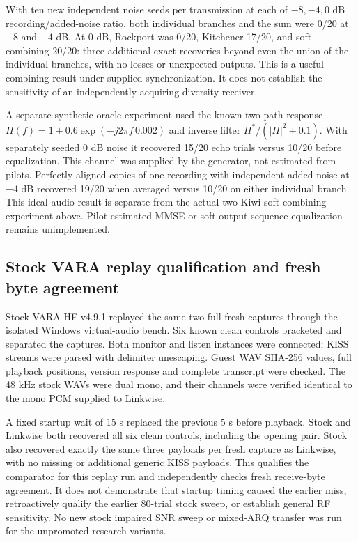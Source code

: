 \documentclass[11pt,a4paper]{article}
\begin{document}
With ten new independent noise seeds per transmission at each of $-8,-4,0$
dB recording/added-noise ratio, both individual branches and the sum were
0/20 at $-8$ and $-4$ dB. At 0 dB, Rockport was 0/20, Kitchener 17/20, and
soft combining 20/20: three additional exact recoveries beyond even the
union of the individual branches, with no losses or unexpected outputs.
This is a useful combining result under supplied synchronization. It does
not establish the sensitivity of an independently acquiring diversity receiver.

A separate synthetic oracle experiment used the known two-path response
$H(f)=1+0.6\exp(-j2\pi f\,0.002)$ and inverse filter
$H^*/(|H|^2+0.1)$. With separately seeded 0 dB noise it recovered 15/20 echo
trials versus 10/20 before equalization. This channel was supplied by the
generator, not estimated from pilots. Perfectly aligned copies of one recording
with independent added noise at $-4$ dB recovered 19/20 when averaged versus
10/20 on either individual branch. This ideal audio result is separate from
the actual two-Kiwi soft-combining experiment above. Pilot-estimated MMSE or
soft-output sequence equalization remains unimplemented.

\subsection{Stock VARA replay qualification and fresh byte agreement}
Stock VARA HF v4.9.1 replayed the same two full fresh captures through the
isolated Windows virtual-audio bench. Six known clean controls bracketed
and separated the captures. Both monitor and listen instances were connected;
KISS streams were parsed with delimiter unescaping. Guest WAV SHA-256 values,
full playback positions, version response and complete transcript were checked.
The 48 kHz stock WAVs were dual mono, and their channels were verified identical
to the mono PCM supplied to Linkwise.

A fixed startup wait of 15 s replaced the previous 5 s before playback.
Stock and Linkwise both recovered all six clean controls, including the
opening pair. Stock also recovered exactly the same three payloads per fresh
capture as Linkwise, with no missing or additional generic KISS payloads.
This qualifies the comparator for this replay run and independently checks
fresh receive-byte agreement. It does not demonstrate that startup timing
caused the earlier miss, retroactively qualify the earlier 80-trial stock
sweep, or establish general RF sensitivity. No new stock impaired SNR sweep
or mixed-ARQ transfer was run for the unpromoted research variants.
\end{document}

